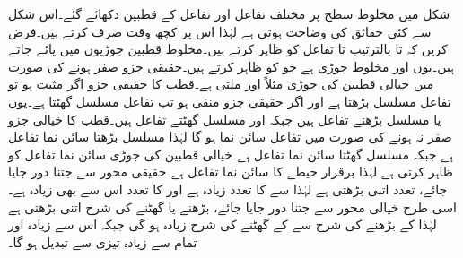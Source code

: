 شکل  میں مخلوط سطح پر مختلف تفاعل اور تفاعل کے  قطبین  دکھائے گئے۔اس شکل سے کئی حقائق کی وضاحت ہوتی ہے لہٰذا اس پر کچھ وقت صرف کرتے ہیں۔فرض کریں کہ  تا  بالترتیب  تا  تفاعل کو ظاہر کرتے ہیں۔مخلوط قطبین جوڑیوں میں پائے جاتے ہیں۔یوں  اور  مخلوط جوڑی ہے جو  کو ظاہر کرتے ہیں۔حقیقی جزو صفر ہونے کی صورت میں خیالی قطبین کی جوڑی مثلاً  اور  ملتی ہے۔قطب کا حقیقی جزو اگر مثبت ہو تو تفاعل مسلسل بڑھتا ہے اور اگر حقیقی  جزو منفی ہو تب تفاعل مسلسل گھٹتا ہے۔یوں  یا  مسلسل بڑھتے تفاعل ہیں جبکہ  اور  مسلسل گھٹتے تفاعل ہیں۔قطب کا خیالی جزو صفر نہ ہونے کی صورت میں تفاعل سائن نما ہو گا لہٰذا  مسلسل بڑھتا سائن نما تفاعل ہے جبکہ   مسلسل گھٹتا سائن نما تفاعل ہے۔خیالی قطبین کی جوڑی سائن نما تفاعل کو ظاہر کرتی ہے لہٰذا  برقرار حیطے کا سائن نما تفاعل ہے۔حقیقی محور سے جتنا دور جایا جائے، تعدد اتنی بڑھتی ہے لہٰذا  سے  کا تعدد زیادہ ہے اور  کا تعدد اس سے بھی زیادہ ہے۔اسی طرح خیالی محور سے جتنا دور جایا جائے، بڑھنے یا گھٹنے کی شرح اتنی بڑھتی ہے لہٰذا  کے بڑھنے کی شرح سے  کے گھٹنے کی شرح زیادہ ہو گی جبکہ  اس سے زیادہ اور  تمام سے زیادہ تیزی سے تبدیل ہو گا۔
